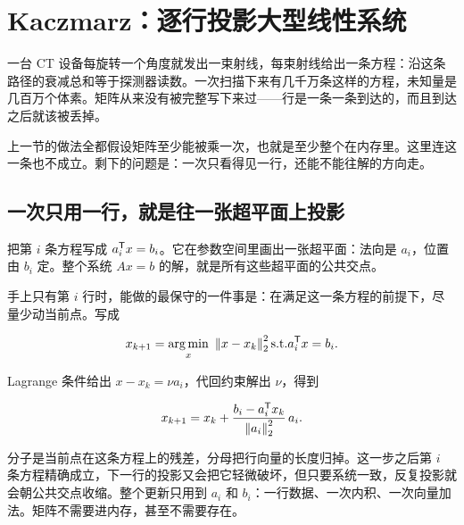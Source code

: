 \section{Kaczmarz：逐行投影大型线性系统}
\label{sec:08-Numerical-Analysis/05-Numerical-Linear-Algebra/07}

一台 CT 设备每旋转一个角度就发出一束射线，每束射线给出一条方程：沿这条路径的衰减总和等于探测器读数。一次扫描下来有几千万条这样的方程，未知量是几百万个体素。矩阵从来没有被完整写下来过——行是一条一条到达的，而且到达之后就该被丢掉。

上一节的做法全都假设矩阵至少能被乘一次，也就是至少整个在内存里。这里连这一条也不成立。剩下的问题是：一次只看得见一行，还能不能往解的方向走。

\subsection{一次只用一行，就是往一张超平面上投影}

把第 \(i\) 条方程写成 \(a_i^{\mathsf{T}}x=b_i\)。它在参数空间里画出一张超平面：法向是 \(a_i\)，位置由 \(b_i\) 定。整个系统 \(Ax=b\) 的解，就是所有这些超平面的公共交点。

手上只有第 \(i\) 行时，能做的最保守的一件事是：在满足这一条方程的前提下，尽量少动当前点。写成

\[
x_{k+1}=\operatorname*{arg\,min}_{x}\ \left\lVert x-x_k\right\rVert_2^2
\space\text{s.t.}\space a_i^{\mathsf{T}}x=b_i .
\]

Lagrange 条件给出 \(x-x_k=\nu a_i\)，代回约束解出 \(\nu\)，得到

\[
x_{k+1}=x_k+\frac{b_i-a_i^{\mathsf{T}}x_k}{\left\lVert a_i\right\rVert_2^2}\,a_i .
\]

分子是当前点在这条方程上的残差，分母把行向量的长度归掉。这一步之后第 \(i\) 条方程精确成立，下一行的投影又会把它轻微破坏，但只要系统一致，反复投影就会朝公共交点收缩。整个更新只用到 \(a_i\) 和 \(b_i\)：一行数据、一次内积、一次向量加法。矩阵不需要进内存，甚至不需要存在。

